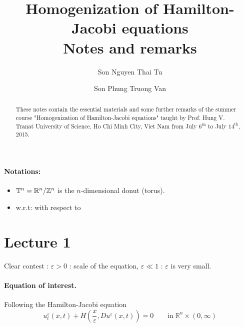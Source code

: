\documentclass[12pt, oneside]{amsart}  	%
\title{Homogenization of Hamilton-Jacobi equations\\ 
Notes and remarks}
\author{Son Nguyen Thai Tu}
\author{Son Phung Truong Van}
\date{}							%
\newcommand\Z{\mathbb{Z}} \newcommand\N{\mathbb{N}} \newcommand\C{\mathbb{C}}
\begin{document}
\maketitle

\begin{abstract}
These notes contain the essential materials and some further remarks of the summer course "Homogenization of Hamilton-Jacobi equations" taught by Prof. Hung V. Tran\footnotemark at University of Science, Ho Chi Minh City, Viet Nam from July $6^{\text{th}}$ to July $14^{\text{th}}$, 2015.
\end{abstract}






\newpage



\paragraph{\textbf{Notations:}}
\begin{itemize}
	\item $\mathbb{T}^n=\R^n/\Z^n$ is the $n$-dimensional donut (torus).
	\item w.r.t: with respect to
\end{itemize}

\vspace*{0.5cm}

\vspace*{0.5cm}
\section*{{\LARGE Lecture 1}}
\vspace*{0.5cm}

Clear contest : $\varepsilon>0$ : scale of the equation, $\varepsilon \ll 1$ : $\varepsilon$ is very small.\\

\paragraph{\textbf{Equation of interest.}} Following the Hamilton-Jacobi equation
\begin{equation}
u_t^{\varepsilon} (x,t) + H\left(\frac{x}{\varepsilon},Du^\varepsilon(x,t)\right) = 0\qquad\text{in}\;\mathbb{R}^n\times (0,\infty) \tag{I} \label{eq}
\end{equation}
\end{document}

